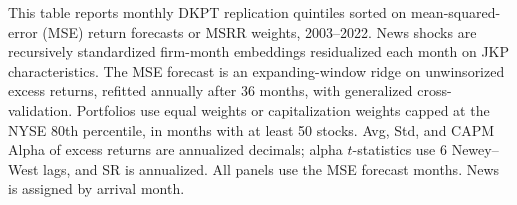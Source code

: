 \begin{table}[htbp]
\centering
\caption{DKPT Replication: News-Shock Portfolio Sorts}
\label{tab:tabR7_did_sorts}
\begin{minipage}{\linewidth}\footnotesize
This table reports monthly DKPT replication quintiles sorted on mean-squared-error (MSE) return forecasts or MSRR weights, 2003--2022. News shocks are recursively standardized firm-month embeddings residualized each month on JKP characteristics. The MSE forecast is an expanding-window ridge on unwinsorized excess returns, refitted annually after 36 months, with generalized cross-validation. Portfolios use equal weights or capitalization weights capped at the NYSE 80th percentile, in months with at least 50 stocks. Avg, Std, and CAPM Alpha of excess returns are annualized decimals; alpha $t$-statistics use 6 Newey--West lags, and SR is annualized. All panels use the MSE forecast months. News is assigned by arrival month.
\end{minipage}
\medskip


\end{table}
